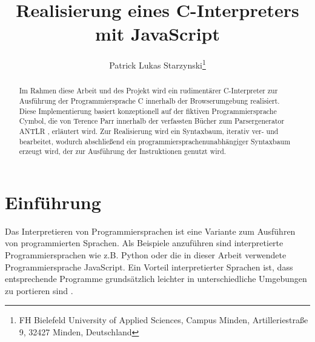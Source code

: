 \documentclass[]{lni}
\begin{document}
	
	
\title[JS-C-Interpreter]{Realisierung eines C-Interpreters mit JavaScript}
\author[Patrick Lukas Starzynski]
{Patrick Lukas Starzynski\footnote{FH Bielefeld University of Applied Sciences, Campus Minden, Artilleriestraße 9, 32427 Minden,
Deutschland }}
\maketitle

\begin{abstract}

Im Rahmen diese Arbeit und des Projekt wird ein rudimentärer C-Interpreter zur Ausführung der Programmiersprache C innerhalb der Browserumgebung realisiert. Diese Implementierung basiert konzeptionell auf der fiktiven Programmiersprache Cymbol, die von Terence Parr innerhalb der verfassten Bücher zum Parsergenerator ANTLR \cite{Parr2009} \cite{Parr2013}, erläutert wird. 
Zur Realisierung wird ein Syntaxbaum, iterativ ver- und bearbeitet, wodurch abschließend ein programmiersprachenunabhängiger Syntaxbaum erzeugt wird, der zur Ausführung der Instruktionen genutzt wird.
\end{abstract}
\section{Einführung}
Das Interpretieren von Programmiersprachen ist eine Variante zum Ausführen von programmierten Sprachen. Als Beispiele anzuführen sind interpretierte Programmiersprachen wie z.B. Python oder die in dieser Arbeit verwendete Programmiersprache JavaScript. Ein Vorteil interpretierter Sprachen ist, dass entsprechende Programme grundsätzlich leichter in unterschiedliche Umgebungen zu portieren sind \cite{mogensen}.
\end{document}
